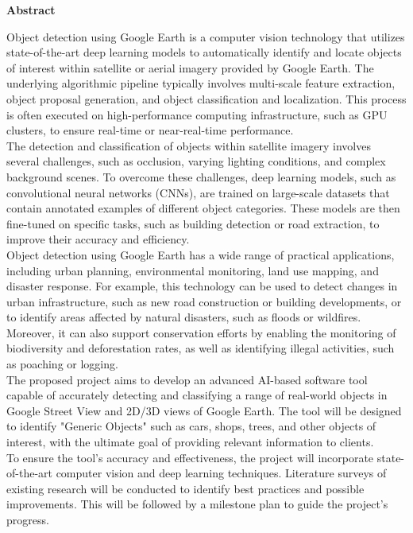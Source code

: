 
\begin{center}\textbf{Abstract}\end{center}
Object detection using Google Earth is a computer vision technology that utilizes state-of-the-art deep learning models to automatically identify and locate objects of interest within satellite or aerial imagery provided by Google Earth. The underlying algorithmic pipeline typically involves multi-scale feature extraction, object proposal generation, and object classification and localization. This process is often executed on high-performance computing infrastructure, such as GPU clusters, to ensure real-time or near-real-time performance.\\

The detection and classification of objects within satellite imagery involves several challenges, such as occlusion, varying lighting conditions, and complex background scenes. To overcome these challenges, deep learning models, such as convolutional neural networks (CNNs), are trained on large-scale datasets that contain annotated examples of different object categories. These models are then fine-tuned on specific tasks, such as building detection or road extraction, to improve their accuracy and efficiency.\\

Object detection using Google Earth has a wide range of practical applications, including urban planning, environmental monitoring, land use mapping, and disaster response. For example, this technology can be used to detect changes in urban infrastructure, such as new road construction or building developments, or to identify areas affected by natural disasters, such as floods or wildfires. Moreover, it can also support conservation efforts by enabling the monitoring of biodiversity and deforestation rates, as well as identifying illegal activities, such as poaching or logging.\\

The proposed project aims to develop an advanced AI-based software tool capable of accurately detecting and classifying a range of real-world objects in Google Street View and 2D/3D views of Google Earth. The tool will be designed to identify "Generic Objects" such as cars, shops, trees, and other objects of interest, with the ultimate goal of providing relevant information to clients.\\

To ensure the tool's accuracy and effectiveness, the project will incorporate state-of-the-art computer vision and deep learning techniques. Literature surveys of existing research will be conducted to identify best practices and possible improvements. This will be followed by a milestone plan to guide the project's progress.\\


